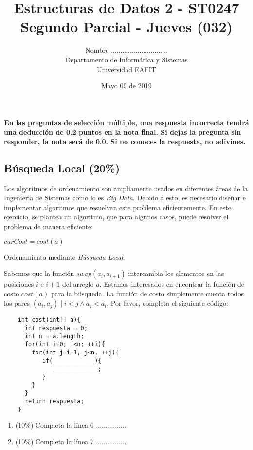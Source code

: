 \documentclass[10 pt]{article}
\title{\textbf {Estructuras de Datos 2 - ST0247\\Segundo Parcial - Jueves (032)}}
\author{Nombre ..............................\\
		Departamento de Informática y Sistemas\\
		Universidad EAFIT\\}
\date{Mayo 09 de 2019}
\begin{document}
\lstset{escapechar=@,style=customc, numbers=left, stepnumber = 1} 
\maketitle
\textbf{En las preguntas de selección múltiple, una respuesta incorrecta tendrá
una deducción de 0.2 puntos en la nota final. Si dejas la pregunta sin
responder, la nota será de 0.0. Si no conoces la respuesta, no adivines.}


\begin{multicols}{2}

	\section{Búsqueda Local (20\%)}
	Los algoritmos de ordenamiento son ampliamente usados en diferentes áreas de la Ingeniería de Sistemas como lo es \textit{Big Data}. Debido a esto, es necesario diseñar e implementar algoritmos que resuelvan este problema eficientemente. En este ejercicio, se plantea un algoritmo, que para algunos casos, puede resolver el problema de manera eficiente:
	\begin{algorithm}[H]
		$curCost = cost(a)$\;
		\caption{Ordenamiento mediante \emph{Búsqueda Local}.}
	\end{algorithm}
	Sabemos que la función $swap(a_i, a_{i+1})$ intercambia los elementos en las posiciones $i$ e $i + 1$ del arreglo $a$. Estamos interesados en encontrar la función de costo $cost(a)$ para la búsqueda. La función de costo simplemente cuenta todos los pares $(a_i, a_j) \mid i < j \land a_j < a_i$. Por favor, completa el siguiente código:
	\begin{lstlisting}
	int cost(int[] a){
	  int respuesta = 0;
	  int n = a.length;
	  for(int i=0; i<n; ++i){
	    for(int j=i+1; j<n; ++j){
	       if(____________){
	          _____________;
	       }
	    }
	  }
	  return respuesta;
	}
	\end{lstlisting}
	\begin{enumerate}[label=\alph*]
		\item (10\%) Completa la línea 6 ................
		\item (10\%) Completa la línea 7 ................
	\end{enumerate}



\end{multicols}
\end{document}

